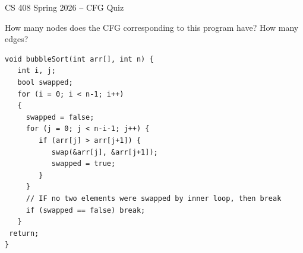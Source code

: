 \documentclass[addpoints]{exam}
\begin{document}
\thispagestyle{empty}

\begin{center}
	{\LARGE CS 408 Spring 2026 -- CFG Quiz \\}
\end{center}


\vspace{10mm}


\begin{questions}

\question How many nodes does the CFG corresponding to this program
  have? How many edges?
  \begin{verbatim}
void bubbleSort(int arr[], int n) {
   int i, j;
   bool swapped;
   for (i = 0; i < n-1; i++)
   {
     swapped = false;
     for (j = 0; j < n-i-1; j++) {
        if (arr[j] > arr[j+1]) {
           swap(&arr[j], &arr[j+1]);
           swapped = true;
        }
     }
     // IF no two elements were swapped by inner loop, then break
     if (swapped == false) break;
   }
 return;
}
\end{verbatim}
  \begin{solution} %
  \end{solution}

\end{questions}
\end{document}
